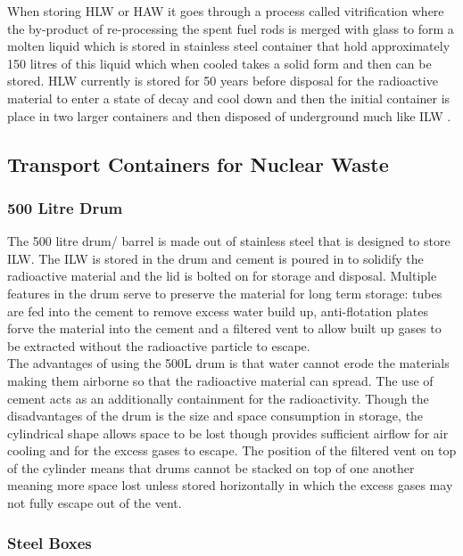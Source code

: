 When storing HLW or HAW it goes through a process called vitrification where the by-product of re-processing the spent fuel rods is merged with glass to form a molten liquid which is stored in stainless steel container that hold approximately 150 litres of this liquid which when cooled takes a solid form and then can be stored. HLW currently is stored for 50 years before disposal for the radioactive material to enter a state of decay and cool down and then the initial container is place in two larger containers and then disposed of underground much like ILW \cite{ManageNuclearWaste}.

\subsection{Transport Containers for Nuclear Waste}
\label{Transport Containers for Nuclear Waste SubSection}

\subsubsection*{500 Litre Drum}
\label{500 Litre Drum SubSubSection}

The 500 litre drum/ barrel is made out of stainless steel that is designed to store ILW. The ILW is stored in the drum and cement is poured in to solidify the radioactive material and the lid is bolted on for storage and disposal. Multiple features in the drum serve to preserve the material for long term storage: tubes are fed into the cement to remove excess water build up, anti-flotation plates forve the material into the cement and a filtered vent to allow built up gases to be extracted without the radioactive particle to escape. \\

The advantages of using the 500L drum is that water cannot erode the materials making them airborne so that the radioactive material can spread. The use of cement acts as an additionally containment for the radioactivity. Though the disadvantages of the drum is the size and space consumption in storage, the cylindrical shape allows space to be lost though provides sufficient airflow for air cooling and for the excess gases to escape. The position of the filtered vent on top of the cylinder means that drums cannot be stacked on top of one another meaning more space lost unless stored horizontally in which the excess gases may not fully escape out of the vent.

\subsubsection*{Steel Boxes}
\label{Steel Boxes SubSubSection}

